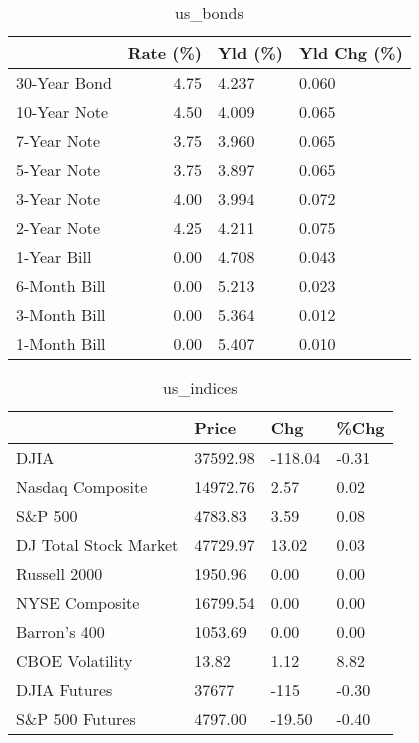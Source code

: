\documentclass{article}%
\begin{document}
\begin{table}[htbp]%
\caption{us\_bonds}%
\centering%
\begin{adjustbox}{width=1\textwidth}%
\begin{tabular}{lrll}
\toprule
             &  Rate (\%) & Yld (\%) & Yld Chg (\%) \\
\midrule
30-Year Bond &      4.75 &   4.237 &       0.060 \\
10-Year Note &      4.50 &   4.009 &       0.065 \\
 7-Year Note &      3.75 &   3.960 &       0.065 \\
 5-Year Note &      3.75 &   3.897 &       0.065 \\
 3-Year Note &      4.00 &   3.994 &       0.072 \\
 2-Year Note &      4.25 &   4.211 &       0.075 \\
 1-Year Bill &      0.00 &   4.708 &       0.043 \\
6-Month Bill &      0.00 &   5.213 &       0.023 \\
3-Month Bill &      0.00 &   5.364 &       0.012 \\
1-Month Bill &      0.00 &   5.407 &       0.010 \\
\bottomrule
\end{tabular}
%
\end{adjustbox}%
\end{table}

%


\begin{table}[htbp]%
\caption{us\_indices}%
\centering%
\begin{adjustbox}{width=1\textwidth}%
\begin{tabular}{llll}
\toprule
                      &    Price &     Chg &  \%Chg \\
\midrule
                 DJIA & 37592.98 & -118.04 & -0.31 \\
     Nasdaq Composite & 14972.76 &    2.57 &  0.02 \\
              S\&P 500 &  4783.83 &    3.59 &  0.08 \\
DJ Total Stock Market & 47729.97 &   13.02 &  0.03 \\
         Russell 2000 &  1950.96 &    0.00 &  0.00 \\
       NYSE Composite & 16799.54 &    0.00 &  0.00 \\
         Barron's 400 &  1053.69 &    0.00 &  0.00 \\
      CBOE Volatility &    13.82 &    1.12 &  8.82 \\
         DJIA Futures &    37677 &    -115 & -0.30 \\
      S\&P 500 Futures &  4797.00 &  -19.50 & -0.40 \\
\bottomrule
\end{tabular}
%
\end{adjustbox}%
\end{table}
\end{document}
